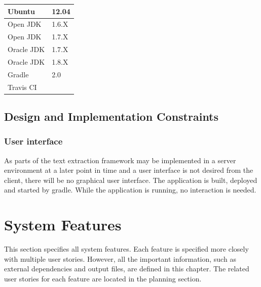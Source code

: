 \begin{tabular}{| p{3cm} | p{3cm} |}
	\hline
	Ubuntu & 12.04 \\ \hline
	Open JDK & 1.6.X  \\ \hline
	Open JDK & 1.7.X  \\ \hline
	Oracle JDK & 1.7.X \\ \hline
	Oracle JDK & 1.8.X  \\ \hline
	Gradle & 2.0 \\ \hline
	Travis CI &  \\ \hline
\end{tabular}



\subsection{Design and Implementation Constraints}

\subsubsection{User interface}
As parts of the text extraction framework may be implemented in a server environment at a later point in time and a user interface is not desired from the client, there will be no graphical user interface. The application is built, deployed and started by gradle. While the application is running, no interaction is needed.


\section{System Features}

This section specifies all system features. Each feature is specified more closely with multiple user stories. However, all the important information, such as external dependencies and output files, are defined in this chapter. The related user stories for each feature are located in the planning section.  




